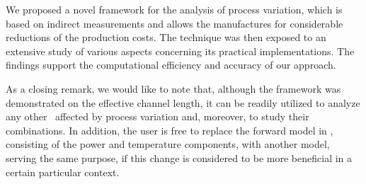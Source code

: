 We proposed a novel framework for the analysis of process variation, which is based on indirect measurements and allows the manufactures for considerable reductions of the production costs. The technique was then exposed to an extensive study of various aspects concerning its practical implementations. The findings support the computational efficiency and accuracy of our approach.

As a closing remark, we would like to note that, although the framework was demonstrated on the effective channel length, it can be readily utilized to analyze any other \qois\ affected by process variation and, moreover, to study their combinations. In addition, the user is free to replace the forward model in , consisting of the power and temperature components, with another model, serving the same purpose, if this change is considered to be more beneficial in a certain particular context.
